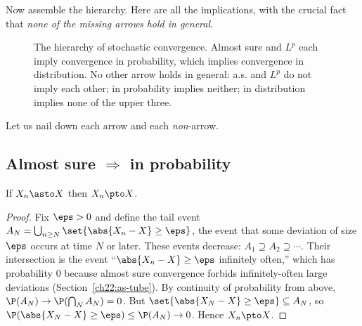 Now assemble the hierarchy. Here are all the implications, with the crucial fact that
\emph{none of the missing arrows hold in general}.

\begin{figure}[H]
\centering
{}
\caption{The hierarchy of stochastic convergence. Almost sure and $L^p$ each imply
convergence in probability, which implies convergence in distribution. No other arrow
holds in general: a.s. and $L^p$ do not imply each other; in probability implies
neither; in distribution implies none of the upper three.}
\label{ch22:fig-diagram}
\end{figure}

Let us nail down each arrow and each \emph{non}-arrow.

\subsection{Almost sure \texorpdfstring{$\Rightarrow$}{=>} in probability}
\label{ch22:as-imp-p}

\begin{theorem}
\label{ch22:thm-as-p}
If $X_n\asto X$ then $X_n\pto X$.
\end{theorem}

\begin{proof}
Fix $\eps>0$ and define the tail event $A_N = \bigcup_{n\ge N}\set{\abs{X_n-X}\ge\eps}$,
the event that some deviation of size $\eps$ occurs at time $N$ or later. These events
decrease: $A_1 \supseteq A_2 \supseteq \cdots$. Their intersection is the event
``$\abs{X_n - X}\ge\eps$ infinitely often,'' which has probability $0$ because almost
sure convergence forbids infinitely-often large deviations
(Section~\ref{ch22:as-tube}). By continuity of probability from above,
$\P(A_N)\to\P(\bigcap_N A_N)=0$. But $\set{\abs{X_N-X}\ge\eps}\subseteq A_N$, so
$\P(\abs{X_N-X}\ge\eps)\le\P(A_N)\to0$. Hence $X_n\pto X$.
\end{proof}

